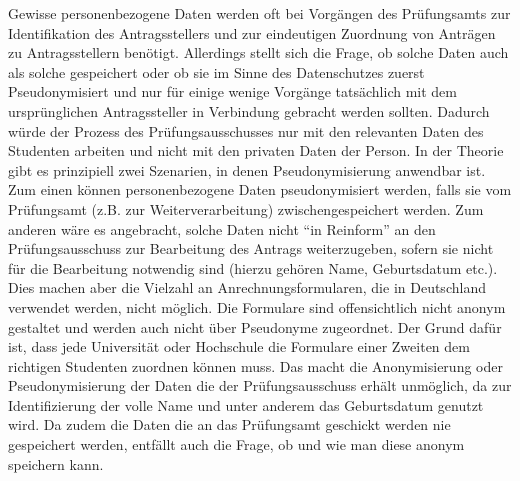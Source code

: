 Gewisse personenbezogene Daten werden oft bei Vorgängen des Prüfungsamts zur Identifikation des Antragsstellers und zur eindeutigen Zuordnung von Anträgen zu Antragsstellern benötigt. Allerdings stellt sich die Frage, ob solche Daten auch als solche gespeichert oder ob sie im Sinne des Datenschutzes zuerst Pseudonymisiert und nur für einige wenige Vorgänge tatsächlich mit dem ursprünglichen Antragssteller in Verbindung gebracht werden sollten. Dadurch würde der Prozess des Prüfungsausschusses  nur mit den relevanten Daten des Studenten arbeiten und nicht mit den privaten Daten der Person. 
In der Theorie gibt es prinzipiell zwei Szenarien, in denen Pseudonymisierung anwendbar ist. Zum einen können personenbezogene Daten pseudonymisiert werden, falls sie vom Prüfungsamt (z.B. zur Weiterverarbeitung) zwischengespeichert werden. Zum anderen wäre es angebracht, solche Daten nicht “in Reinform” an den Prüfungsausschuss zur Bearbeitung des Antrags weiterzugeben, sofern sie nicht für die Bearbeitung notwendig sind (hierzu gehören Name, Geburtsdatum etc.).
Dies machen aber die Vielzahl an Anrechnungsformularen, die in Deutschland verwendet werden, nicht möglich. Die Formulare sind offensichtlich nicht anonym gestaltet und werden auch nicht über Pseudonyme zugeordnet. Der Grund dafür ist, dass jede Universität oder Hochschule die Formulare einer Zweiten dem richtigen Studenten zuordnen können muss. Das macht die Anonymisierung oder Pseudonymisierung der Daten die der Prüfungsausschuss erhält unmöglich, da zur Identifizierung der volle Name und unter anderem das Geburtsdatum genutzt wird. Da zudem die Daten die an das Prüfungsamt geschickt werden nie gespeichert werden, entfällt auch die Frage, ob und wie man diese anonym speichern kann.
